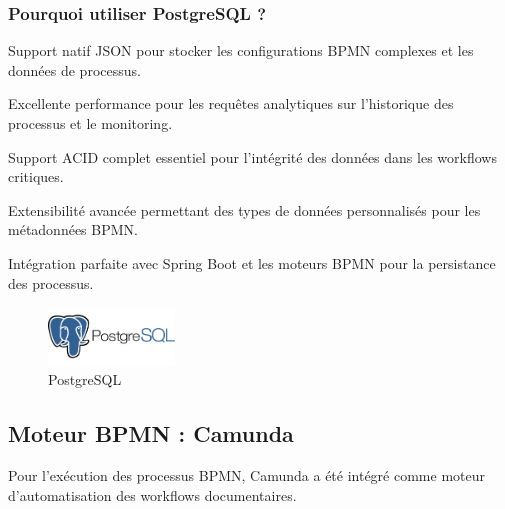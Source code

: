 \subsubsection{Pourquoi utiliser PostgreSQL ?}
\begin{dinglist}{80}
    \item Support natif JSON pour stocker les configurations BPMN complexes et les données de processus.
    \item Excellente performance pour les requêtes analytiques sur l'historique des processus et le monitoring.
    \item Support ACID complet essentiel pour l'intégrité des données dans les workflows critiques.
    \item Extensibilité avancée permettant des types de données personnalisés pour les métadonnées BPMN.
    \item Intégration parfaite avec Spring Boot et les moteurs BPMN pour la persistance des processus.
\end{dinglist}

\begin{figure}[H]
    \centering
    \includegraphics[width=0.3\textwidth]{Images/postgresql.png}
    \caption{PostgreSQL}
    \label{fig:postgresql}
\end{figure}

\subsection{Moteur BPMN : Camunda}

Pour l'exécution des processus BPMN, Camunda a été intégré comme moteur d'automatisation des workflows documentaires.

